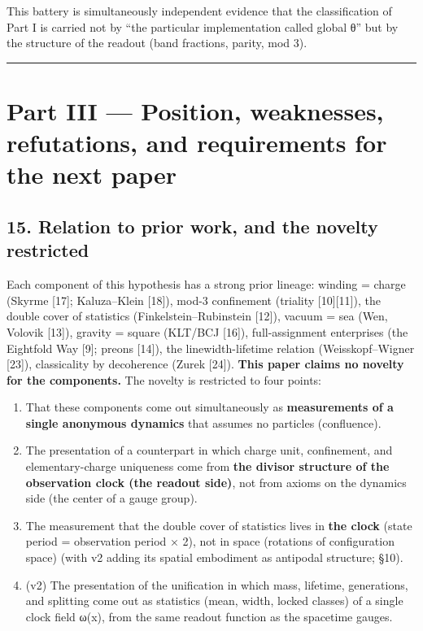 \documentclass[
]{article}
\providecommand{\tightlist}{%
  \setlength{\itemsep}{0pt}\setlength{\parskip}{0pt}}
\begin{document}
This battery is simultaneously independent evidence that the
classification of Part I is carried not by ``the particular
implementation called global θ'' but by the structure of the readout
(band fractions, parity, mod 3).

\begin{center}\rule{0.5\linewidth}{0.5pt}\end{center}

\section{Part III --- Position, weaknesses, refutations, and
requirements for the next
paper}\label{part-iii-position-weaknesses-refutations-and-requirements-for-the-next-paper}

\subsection{15. Relation to prior work, and the novelty
restricted}\label{relation-to-prior-work-and-the-novelty-restricted}

Each component of this hypothesis has a strong prior lineage: winding =
charge (Skyrme {[}17{]}; Kaluza--Klein {[}18{]}), mod-3 confinement
(triality {[}10{]}{[}11{]}), the double cover of statistics
(Finkelstein--Rubinstein {[}12{]}), vacuum = sea (Wen, Volovik
{[}13{]}), gravity = square (KLT/BCJ {[}16{]}), full-assignment
enterprises (the Eightfold Way {[}9{]}; preons {[}14{]}), the
linewidth-lifetime relation (Weisskopf--Wigner {[}23{]}), classicality
by decoherence (Zurek {[}24{]}). \textbf{This paper claims no novelty
for the components.} The novelty is restricted to four points:

\begin{enumerate}
\def\labelenumi{\arabic{enumi}.}
\tightlist
\item
  That these components come out simultaneously as \textbf{measurements
  of a single anonymous dynamics} that assumes no particles
  (confluence).
\item
  The presentation of a counterpart in which charge unit, confinement,
  and elementary-charge uniqueness come from \textbf{the divisor
  structure of the observation clock (the readout side)}, not from
  axioms on the dynamics side (the center of a gauge group).
\item
  The measurement that the double cover of statistics lives in
  \textbf{the clock} (state period = observation period × 2), not in
  space (rotations of configuration space) (with v2 adding its spatial
  embodiment as antipodal structure; §10).
\item
  (v2) The presentation of the unification in which mass, lifetime,
  generations, and splitting come out as statistics (mean, width, locked
  classes) of a single clock field ω(x), from the same readout function
  as the spacetime gauges.
\end{enumerate}
\end{document}
